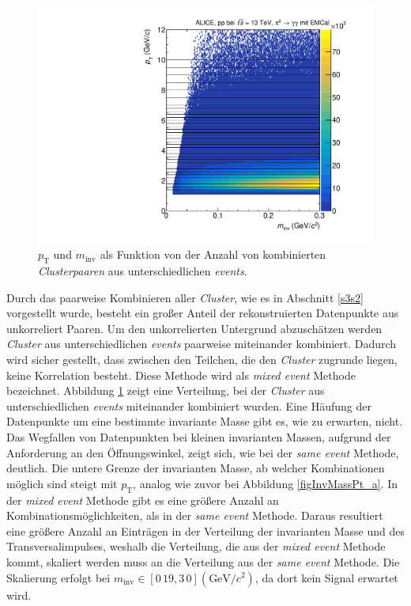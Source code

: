 \begin{figure}[t!]
\centering
\includegraphics[width=.7\linewidth]{hInvMass_pT_Bkg.pdf}
\caption{$p_\text{T}$ und $m_\text{inv}$ als Funktion von der Anzahl von kombinierten  \textit{Clusterpaaren} aus unterschiedlichen \textit{events}.}
\label{figInvMassPt_b}
\end{figure}
Durch das paarweise Kombinieren aller \textit{Cluster}, wie es in Abschnitt \ref{s3s2} vorgestellt wurde, besteht ein großer Anteil der rekonstruierten Datenpunkte aus unkorreliert Paaren.
Um den unkorrelierten Untergrund abzuschätzen werden \textit{Cluster} aus unterschiedlichen \textit{events} paarweise miteinander kombiniert.
Dadurch wird sicher gestellt, dass zwischen den Teilchen, die den \textit{Cluster} zugrunde liegen, keine Korrelation besteht.
Diese Methode wird als \textit{mixed event} Methode bezeichnet.
Abbildung \ref{figInvMassPt_b} zeigt eine Verteilung, bei der \textit{Cluster} aus unterschiedlichen \textit{events} miteinander kombiniert wurden.
Eine Häufung der Datenpunkte um eine bestimmte invariante Masse gibt es, wie zu erwarten, nicht.
Das Wegfallen von Datenpunkten bei kleinen invarianten Massen, aufgrund der Anforderung an den Öffnungswinkel, zeigt sich, wie bei der \textit{same event} Methode, deutlich.
Die untere Grenze der invarianten Masse, ab welcher Kombinationen möglich sind steigt mit $p_\text{T}$, analog wie zuvor bei Abbildung  \ref{figInvMassPt_a}.
\newline
In der \textit{mixed event} Methode gibt es eine größere Anzahl an Kombinationsmöglichkeiten, als in der \textit{same event} Methode.
Daraus resultiert eine größere Anzahl an Einträgen in der Verteilung der invarianten Masse und des Transversalimpulses, weshalb die Verteilung, die aus der \textit{mixed event} Methode kommt, skaliert werden muss an die Verteilung aus der \textit{same event} Methode.
Die Skalierung erfolgt bei $m_\text{inv} \in \left[0\,19,3\,0\right] (\text{GeV/}c^{2})$, da dort kein Signal erwartet wird.
